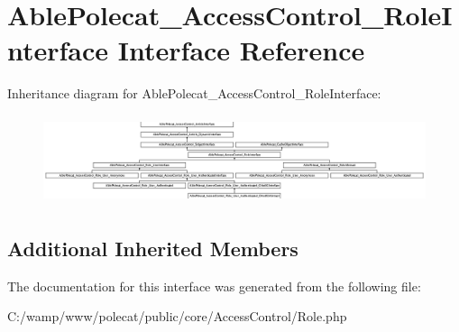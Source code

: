 \hypertarget{interface_able_polecat___access_control___role_interface}{}\section{Able\+Polecat\+\_\+\+Access\+Control\+\_\+\+Role\+Interface Interface Reference}
\label{interface_able_polecat___access_control___role_interface}
Inheritance diagram for Able\+Polecat\+\_\+\+Access\+Control\+\_\+\+Role\+Interface\+:\begin{figure}[H]
\begin{center}
\leavevmode
\includegraphics[height=2.622951cm]{interface_able_polecat___access_control___role_interface}
\end{center}
\end{figure}
\subsection*{Additional Inherited Members}


The documentation for this interface was generated from the following file\+:\begin{DoxyCompactItemize}
\item 
C\+:/wamp/www/polecat/public/core/\+Access\+Control/Role.\+php\end{DoxyCompactItemize}
